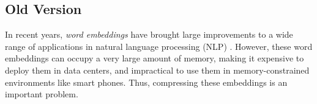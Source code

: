 





\subsection{Old Version}

In recent years, \textit{word embeddings} \citep{word2vec13,glove14,fasttext18} have brought large improvements to a wide range of applications in natural language processing (NLP) \citep{collins16,drqa17}.
However, these word embeddings can occupy a very large amount of memory, making it expensive to deploy them in data centers, and impractical to use them in memory-constrained environments like smart phones. %
Thus, compressing these embeddings is an important problem.

